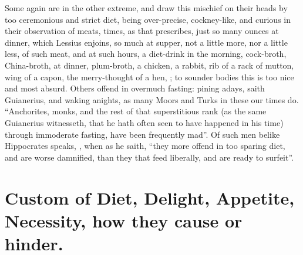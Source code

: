 Some again are in the other extreme, and draw this mischief on their heads by
too ceremonious and strict diet, being over-precise, cockney-like, and curious
in their observation of meats, times, as that  prescribes,
just so many ounces at dinner, which Lessius enjoins, so much at supper, not a
little more, nor a little less, of such meat, and at such hours, a diet-drink
in the morning, cock-broth, China-broth, at dinner, plum-broth, a chicken, a
rabbit, rib of a rack of mutton, wing of a capon, the merry-thought of a hen,
\etc{}; to sounder bodies this is too nice and most absurd. Others offend in
overmuch fasting: pining adays, saith Guianerius, and
waking anights, as many Moors and Turks in these our times do. \enquote{Anchorites,
monks, and the rest of that superstitious rank (as the same Guianerius
witnesseth, that he hath often seen to have happened in his time) through
immoderate fasting, have been frequently mad}. Of such men belike Hippocrates
speaks, , when as he saith,
\enquote{they more offend in too sparing diet, and are worse
damnified, than they that feed liberally, and are ready to surfeit}.

\section{Custom of Diet, Delight, Appetite, Necessity, how they cause or hinder.}


